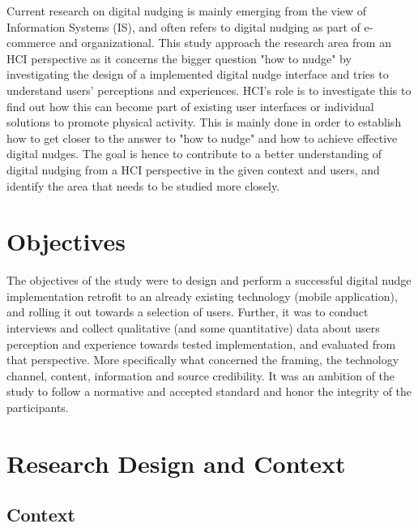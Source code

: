 
Current research on digital nudging is mainly emerging from the view of Information Systems (IS), and often refers to digital nudging as part of e-commerce and organizational. This study approach the research area from an HCI perspective as it concerns the bigger question "how to nudge" by investigating the design of a implemented digital nudge interface and tries to understand users' perceptions and experiences. HCI's role is to investigate this to find out how this can become part of existing user interfaces or individual solutions to promote physical activity. This is mainly done in order to establish how to get closer to the answer to "how to nudge" and how to achieve effective digital nudges. The goal is hence to contribute to a better understanding of digital nudging from a HCI perspective in the given context and users, and identify the area that needs to be studied more closely. 


\section{Objectives}
The objectives of the study were to design and perform a successful digital nudge implementation retrofit to an already existing technology (mobile application), and rolling it out towards a selection of users. Further, it was to conduct interviews and collect qualitative (and some quantitative) data about users perception and experience towards tested implementation, and evaluated from that perspective. More specifically what concerned the framing, the technology channel, content, information and source credibility. It was an ambition of the study to follow a normative and accepted standard and honor the integrity of the participants. 


\section{Research Design and Context}
\subsection{Context  }

